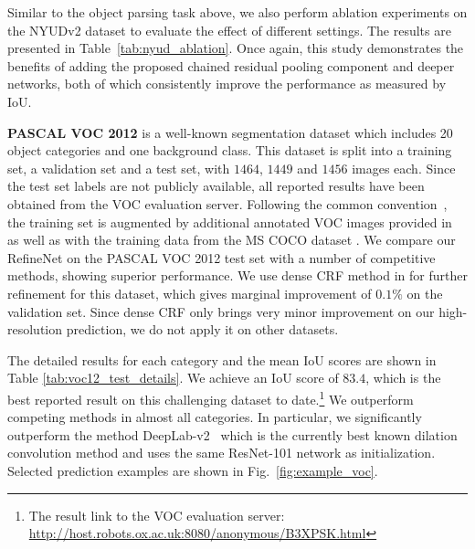 \documentclass[10pt,twocolumn,letterpaper]{article}
\newcommand{\Fig}{Fig.\xspace}
\newcommand{\myparagraph}[1]{\vspace{.5em}\noindent\textbf{#1}}
\begin{document}
Similar to the object parsing task above, we also perform ablation experiments on the NYUDv2 dataset to evaluate the effect of different settings. The results are presented in Table~\ref{tab:nyud_ablation}.
Once again, this study demonstrates the benefits of adding the proposed chained residual pooling component and deeper networks, both of which consistently improve the performance as measured by IoU.

\myparagraph{PASCAL VOC 2012}\cite{everingham2010pascal} is a well-known segmentation dataset which includes 20 object categories and one background class.
This dataset is split into a training set, a validation set and a test set,
with $1464$, $1449$ and $1456$ images each. 
Since the test set labels are not publicly available, all reported results have been obtained from the VOC evaluation server.
%
Following the common convention~\cite{ChenPKMY14,ChenPK0Y16,zheng2015conditional,LiuDPN}, 
the training set is augmented by additional annotated VOC images provided in \cite{HariharanABMM11} as well as with the training data from the MS COCO dataset \cite{lin2014microsoft}.
We compare our RefineNet on the PASCAL VOC 2012 test set with
a number of competitive methods, showing superior performance.
We use dense CRF method in \cite{krahenbuhl2012efficient} for further refinement for this dataset, which gives marginal improvement of $0.1\%$ on the validation set.
Since dense CRF only brings very minor improvement on our high-resolution prediction, we do not apply it on other datasets.

The detailed results for each category and the mean IoU scores are shown in Table \ref{tab:voc12_test_details}.
We achieve an IoU score of $83.4$, which is the best reported result on this challenging dataset to date.\footnote{The result link to the VOC evaluation server: \url{http://host.robots.ox.ac.uk:8080/anonymous/B3XPSK.html}}
We outperform competing methods in almost all categories. 
In particular, we significantly outperform the method DeepLab-v2~\cite{ChenPK0Y16} which is the currently best known dilation convolution method and uses the same ResNet-101 network as initialization.
Selected prediction examples are shown in \Fig~\ref{fig:example_voc}.
\end{document}
